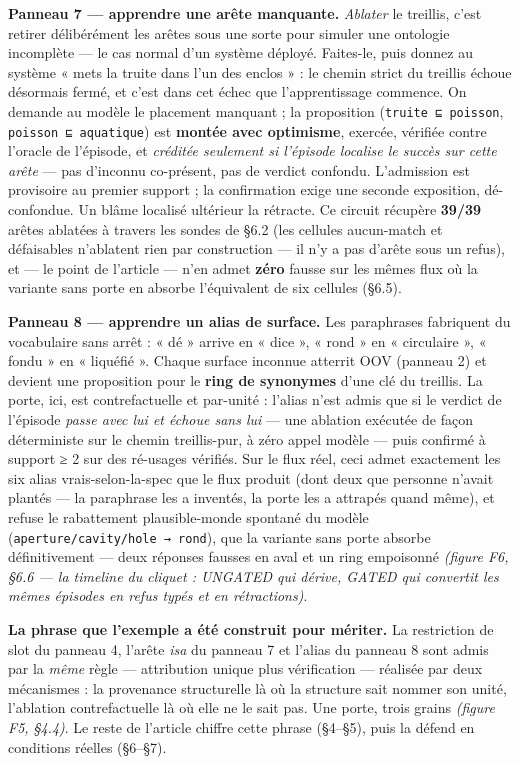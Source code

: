 \documentclass[11pt]{article}
\begin{document}
\textbf{Panneau 7 — apprendre une arête manquante.} \emph{Ablater} le treillis, c'est retirer délibérément les arêtes sous une sorte pour simuler une ontologie incomplète — le cas normal d'un système déployé. Faites-le, puis donnez au système « mets la truite dans l'un des enclos » : le chemin strict du treillis échoue désormais fermé, et c'est dans cet échec que l'apprentissage commence. On demande au modèle le placement manquant ; la proposition (\texttt{truite ⊑ poisson}, \texttt{poisson ⊑ aquatique}) est \textbf{montée avec optimisme}, exercée, vérifiée contre l'oracle de l'épisode, et \emph{créditée seulement si l'épisode localise le succès sur cette arête} — pas d'inconnu co-présent, pas de verdict confondu. L'admission est provisoire au premier support ; la confirmation exige une seconde exposition, dé-confondue. Un blâme localisé ultérieur la rétracte. Ce circuit récupère \textbf{39/39} arêtes ablatées à travers les sondes de §6.2 (les cellules aucun-match et défaisables n'ablatent rien par construction — il n'y a pas d'arête sous un refus), et — le point de l'article — n'en admet \textbf{zéro} fausse sur les mêmes flux où la variante sans porte en absorbe l'équivalent de six cellules (§6.5).

\textbf{Panneau 8 — apprendre un alias de surface.} Les paraphrases fabriquent du vocabulaire sans arrêt : « dé » arrive en « dice », « rond » en « circulaire », « fondu » en « liquéfié ». Chaque surface inconnue atterrit OOV (panneau 2) et devient une proposition pour le \textbf{ring de synonymes} d'une clé du treillis. La porte, ici, est contrefactuelle et par-unité : l'alias n'est admis que si le verdict de l'épisode \emph{passe avec lui et échoue sans lui} — une ablation exécutée de façon déterministe sur le chemin treillis-pur, à zéro appel modèle — puis confirmé à support ≥ 2 sur des ré-usages vérifiés. Sur le flux réel, ceci admet exactement les six alias vrais-selon-la-spec que le flux produit (dont deux que personne n'avait plantés — la paraphrase les a inventés, la porte les a attrapés quand même), et refuse le rabattement plausible-monde spontané du modèle (\texttt{aperture/cavity/hole → rond}), que la variante sans porte absorbe définitivement — deux réponses fausses en aval et un ring empoisonné \emph{(figure F6, §6.6 — la timeline du cliquet : UNGATED qui dérive, GATED qui convertit les mêmes épisodes en refus typés et en rétractions)}.

\textbf{La phrase que l'exemple a été construit pour mériter.} La restriction de slot du panneau 4, l'arête \emph{isa} du panneau 7 et l'alias du panneau 8 sont admis par la \emph{même} règle — attribution unique plus vérification — réalisée par deux mécanismes : la provenance structurelle là où la structure sait nommer son unité, l'ablation contrefactuelle là où elle ne le sait pas. Une porte, trois grains \emph{(figure F5, §4.4)}. Le reste de l'article chiffre cette phrase (§4–§5), puis la défend en conditions réelles (§6–§7).
\end{document}
